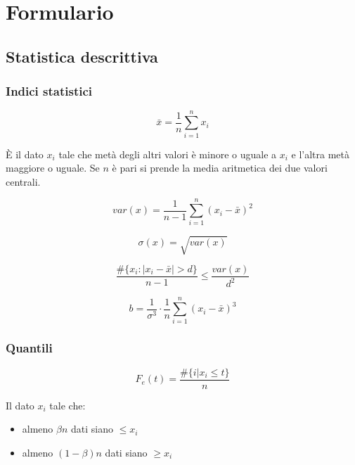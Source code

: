 \section{Formulario}
\subsection{Statistica descrittiva}
\subsubsection{Indici statistici}
\begin{definition}
	\begin{equation}
		\bar{x} = \frac{1}{n}\sum_{i=1}^{n}x_i
	\end{equation}
\end{definition}
\begin{definition}[Mediana]
	È il dato $x_i$ tale che metà degli altri valori è minore o uguale a $x_i$ e l'altra metà maggiore o uguale. Se $n$ è pari si prende la media aritmetica dei due valori centrali.
\end{definition}
\begin{definition}
	\begin{equation}
		var(x)=\frac{1}{n-1}\sum_{i=1}^{n}(x_i - \bar{x})^2
	\end{equation}
\end{definition}
\begin{definition}
	\begin{equation}
		\sigma(x)=\sqrt{var(x)}
	\end{equation}
\end{definition}
\begin{proposition}
	\begin{equation}
		\frac{\# \{x_i : \lvert x_i - \bar{x} \rvert > d\}}{n-1} \leq \frac{var(x)}{d^2}
	\end{equation}
\end{proposition}
\begin{definition}
	\begin{equation}
		b=\frac{1}{\sigma^3}\cdot \frac{1}{n} \sum_{i=1}^{n}(x_i - \bar{x})^3
	\end{equation}
\end{definition}
\subsubsection{Quantili}
\begin{definition}
	\begin{equation}
		F_e(t)=\frac{\# \{i \vert x_i \leq t\}}{n}
	\end{equation}
\end{definition}
\begin{definition}
	Il dato $x_i$ tale che:
	\begin{itemize}
		\item almeno $\beta n$ dati siano $\leq x_i$
		\item almeno $(1-\beta)n$ dati siano $\geq x_i$
	\end{itemize}
\end{definition}
